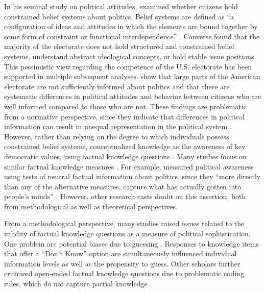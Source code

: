 \documentclass[12pt]{article}
\begin{document}
In his seminal study on political attitudes, \citet{converse1964nature} examined whether citizens hold constrained belief systems about politics. Belief systems are defined as ``a configuration of ideas and attitudes in which the elements are bound together by some form of constraint or functional interdependence'' \citep[207]{converse1964nature}. Converse found that the majority of the electorate does not hold structured and constrained belief systems, understand abstract ideological concepts, or hold stable issue positions. This pessimistic view regarding the competence of the U.S. electorate has been supported in multiple subsequent analyses. \citet{carpini1996americans} show that large parts of the American electorate are not sufficiently informed about politics and that there are systematic differences in political attitudes and behavior between citizens who are well informed compared to those who are not. These findings are problematic from a normative perspective, since they indicate that differences in political information can result in unequal representation in the political system \citep[see also][]{althaus1998information,kuklinski2000misinformation,gilens2001political}. However, rather than relying on the degree to which individuals possess constrained belief systems, \citet{carpini1996americans} conceptualized knowledge as the awareness of key democratic values, using factual knowledge questions \citep[see also][]{carpini1993measuring}. Many studies focus on similar factual knowledge measures \citep[e.g.][]{zaller1991information,gomez2001political}. For example, \citet{zaller1992nature} measured political awareness using tests of neutral factual information about politics, since they ``more directly than any of the alternative measures, capture what has actually gotten into people’s minds'' \citep[21]{zaller1992nature}. However, other research casts doubt on this assertion, both from methodological as well as theoretical perspectives.

From a methodological perspective, many studies raised issues related to the validity of factual knowledge questions as a measure of political sophistication. One problem  are potential biases due to guessing \citep{mondak2000reconsidering,mondak2001developing,mondak2001asked,miller2008experimenting}. Responses to knowledge items that offer a ``Don't Know'' option are simultaneously influenced individual information levels as well as the propensity to guess. Other scholars further criticized open-ended factual knowledge questions due to problematic coding rules, which do not capture partial knowledge \citep{krosnick2008problems,gibson2009knowing,debell2013harder}.
\end{document}
